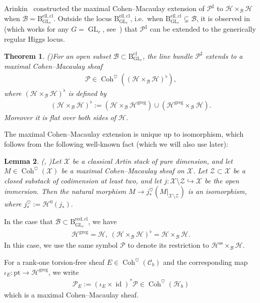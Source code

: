\documentclass[11pt,oneside,a4paper,mathscr]{amsart}
\newtheorem{thm}{Theorem}[section]
\newtheorem{lemma}[thm]{Lemma}
\theoremstyle{definition}
\newcommand{\cH}{\mathcal{H}}
\newcommand{\cB}{\mathcal{B}}
\newcommand{\cC}{\mathcal{C}}
\newcommand{\cP}{\mathcal{P}}
\newcommand{\rB}{\mathrm{B}}
\newcommand{\Coh}{\operatorname{Coh}}
\newcommand{\id}{\operatorname{id}}
\newcommand{\GL}{\operatorname{GL}}
\begin{document}
Arinkin~\cite{Ardual} constructed the maximal Cohen--Macaulay 
extension of $\cP^{\sharp}$ to $\cH\times_{\cB}\cH$
when $\cB=\rB_{\GL_r}^{\mathrm{ell, cl}}$. Outside the locus $\rB_{\GL_r}^{\mathrm{ell, cl}}$, i.e.\ when $\mathrm{B}_{\GL_r}^{\mathrm{ell, cl}} \subsetneq \cB$, it is observed in~\cite[Corollary~3.2.3]{MLi} (which works for any $G=\GL_r$, see~\cite[Remark~2.20]{TodaGL2}) that $\cP^{\sharp}$ can be extended 
to the generically regular Higgs locus. 
\begin{thm}\emph{(\cite{Ardual, MLi})}\label{thm:Pflat}
For an open subset $\cB \subset \rB_{\GL_r}^{\mathrm{cl}}$, 
the line bundle $\cP^{\sharp}$ extends to a maximal 
Cohen--Macaulay sheaf
\begin{align}\label{Arsheaf0}
    \cP\in \Coh^{\heartsuit}((\cH\times_{\cB}\cH)^{\flat}),
\end{align}
where $(\cH\times_{\cB}\cH)^{\flat}$ is defined by 
\begin{align}\label{Pflat}
    (\cH\times_{\cB}\cH)^{\flat}:=
    (\cH\times_{\cB}\cH^{\mathrm{greg}}) \cup (\cH^{\mathrm{greg}}\times_{\cB}\cH).
\end{align}
Moreover it is flat over both sides of $\cH$. 
\end{thm}
The maximal Cohen--Macaulay extension is unique up to isomorphism, which 
follows from the following well-known fact (which we will also use later): 
\begin{lemma}\emph{(\cite[Lemma~2.2]{Ardual}, \cite[Lemma~2.22]{TodaGL2})}\label{lem:MCM-extension}
Let $\mathcal{X}$ be a classical Artin stack of pure dimension, and let
$
M\in \Coh^{\heartsuit}(\mathcal{X})
$
be a maximal Cohen--Macaulay sheaf on $\mathcal{X}$. Let
$\mathcal{Z}\subset \mathcal{X}$ be a closed substack of codimension at
least two, and let
$
j\colon \mathcal{X}\setminus \mathcal{Z}\hookrightarrow \mathcal{X}
$
be the open immersion. Then the natural morphism
$
M \to j^{\heartsuit}_{*}(M|_{\mathcal{X}\setminus \mathcal{Z}})
$
is an isomorphism, where
$
j^{\heartsuit}_{*}:=\mathcal{H}^0(j_*).
$
\end{lemma}

In the case that $\cB\subset \rB_{\GL_r}^{\mathrm{red, cl}}$, 
we have \begin{align*}\cH^{\mathrm{greg}}=\cH, \ 
(\cH\times_{\cB}\cH)^{\flat}=\cH\times_{\cB}\cH.
\end{align*}
In this case, we use 
the same symbol $\cP$ to denote its restriction to 
$\cH^{\mathrm{ss}}\times_{\cB}\cH$. 

For a rank-one torsion-free sheaf $E\in \Coh^{\heartsuit}(\cC_b)$ and 
the corresponding map $\iota_E \colon \mathrm{pt} \to \cH^{\mathrm{greg}}$, 
we write 
\begin{align}\label{def:PE}
\cP_E:=(\iota_E \times \id)^* \cP \in \Coh^{\heartsuit}(\cH_b)
\end{align}
which is a maximal Cohen--Macaulay sheaf. 
\end{document}
